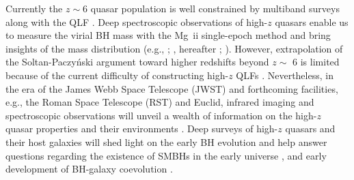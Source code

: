 \documentclass[twocolumn, twocolappendix]{aastex63}
\begin{document}
\begin{CJK*}{UTF8}{gbsn}
Currently the $z\sim 6$ quasar population is well constrained by multiband surveys
\citep{2008AJ....135.1057J,2010AJ....139..906W,2016arXiv161205560C,2018PASJ...70S..35M,2019ApJ...883..183M,2019AJ....157..168D}
along with the QLF \citep[e.g.,][]{2015ApJ...798...28K,2016ApJ...833..222J,2017ApJ...847L..15O,2018ApJ...869..150M}.
Deep spectroscopic observations of high-$z$ quasars enable us to measure the virial BH mass 
with the Mg~{\sc ii} single-epoch method and bring insights of the mass distribution
(e.g., \citealt{2007AJ....134.1150J,2007ApJ...669...32K};
\citealt{2010AJ....140..546W}, hereafter ;
\citealt{2018Natur.553..473B,2019ApJ...880...77O,2019ApJ...873...35S}). 
However, extrapolation of the Soltan-Paczy{\'n}ski argument toward higher redshifts beyond $z\sim$ 6 is limited because of the current difficulty of
constructing high-$z$ QLFs \citep{2013ApJ...768..105M,2016ApJ...829...33Y,2019ApJ...884...30W,2019BAAS...51c.121F}.
Nevertheless, in the era of the James Webb Space Telescope (JWST) and forthcoming facilities,
e.g., the Roman Space Telescope (RST) and Euclid,
infrared imaging and spectroscopic observations will unveil a wealth of information on the
high-$z$ quasar properties and their environments 
\citep{2019BAAS...51c..45R, 2019arXiv190205569A, 2011arXiv1110.3193L}. 
Deep surveys of high-$z$ quasars and their host galaxies will shed light on the early BH evolution and help 
answer questions regarding the existence of SMBHs in the early universe \citep{2012Sci...337..544V,2013ASSL..396..293H,2020ARA&A..58...27I}, 
and early development of BH-galaxy coevolution 
\citep[e.g.,][]{2013ApJ...773...44W,2017ApJ...851L...8V,2021ApJ...914...36I,2022ApJ...927..237I,2022MNRAS.511.3751H}.




\end{CJK*}
\end{document}
